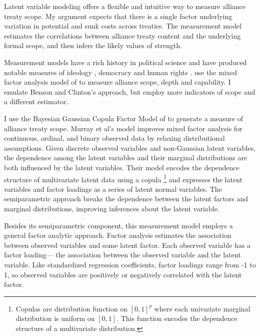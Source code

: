 \documentclass[12pt]{article}
\begin{document}
Latent variable modeling offers a flexible and intuitive way to measure alliance treaty scope. 
My argument expects that there is a single factor underlying variation in potential and sunk costs across treaties.  
The measurement model estimates the correlations between alliance treaty content and the underlying formal scope, and then infers the likely values of strength. 


Measurement models have a rich history in political science and have produced notable measures of ideology \citep{Clintonetal2004}, democracy \citep{TreierJackman2008} and human rights \citep{Fariss2014}. 
\citet{BensonClinton2016} use the mixed factor analysis model of \citet{Quinn2004} to measure alliance scope, depth and capability.
I emulate Benson and Clinton's approach, but employ more indicators of scope and a different estimator. 


I use the Bayesian Gaussian Copula Factor Model of \citet{Murrayetal2013} to generate a measure of alliance treaty scope. 
Murray et al's model improves mixed factor analysis for continuous, ordinal, and binary observed data by relaxing distributional assumptions. 
Given discrete observed variables and non-Gaussian latent variables, the dependence among the latent variables and their marginal distributions are both influenced by the latent variables.
Their model encodes the dependence structure of multivariate latent data using a copula
\footnote{Copulas are distribution function on $[0, 1]^p$ where each univariate marginal distribution is uniform on $[0,1]$. This function encodes the dependence structure of a multivariate distribution.} 
and expresses the latent variables and factor loadings as a series of latent normal variables. 
The semiparametric approach breaks the dependence between the latent factors and marginal distributions, improving inferences about the latent variable. 


Besides its semiparametric component, this measurement model employs a general factor analytic approach.
Factor analysis estimates the association between observed variables and some latent factor.
Each observed variable has a factor loading--- the association between the observed variable and the latent variable.  
Like standardized regression coefficients, factor loadings range from -1 to 1, so observed variables are positively or negatively correlated with the latent factor.  
\end{document}
